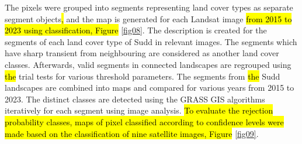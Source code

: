 \documentclass[sustainability,article,submit,pdftex,moreauthors]{Definitions/mdpi}
\begin{document}
The pixels were grouped into segments representing land cover types as separate segment objects\hl{, }and the map is generated for each Landsat image \hl{from 2015 to 2023 using classification, Figure} \ref{fig08}. The description is created for the segments of each land cover type of Sudd in\hl{ }relevant images. The segments which have sharp transient from neighbouring are considered as another land cover classes. Afterwards,\hl{ }valid segments in connected landscapes are regrouped using \hl{the }trial tests for various threshold parameters. The segments from \hl{the }Sudd landscapes are combined into maps and compared for various years from 2015 to 2023. The distinct classes are detected using the GRASS GIS algorithms iteratively for each segment using\hl{ }image analysis. \hl{To evaluate the rejection probability classes, maps of pixel classified according to confidence levels were made based on the classification of nine satellite images, Figure} \ref{fig09}.
\end{document}
